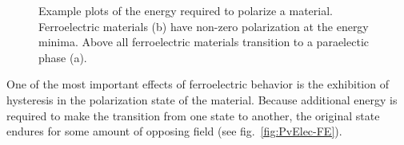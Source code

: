 \begin{figure}[tb]
   \centering
   \caption[Energy vs. Polarization Plots for FE and PE Materials]%
   		{Example plots of the energy required to polarize a material. Ferroelectric materials (b) have %
		non-zero polarization at the energy minima. Above \Tc{} all ferroelectric materials transition %
		to a paraelectic phase (a).}
   \label{fig:EvP}
\end{figure}

One of the most important effects of ferroelectric behavior is the exhibition of hysteresis in the polarization state of the material.  Because additional energy is required to make the transition from one state to another, the original state endures for some amount of opposing field (see fig.~\ref{fig:PvElec-FE}).

